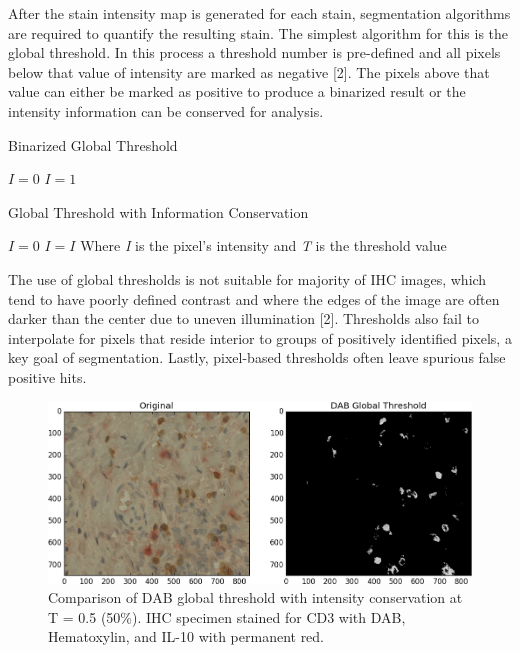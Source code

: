 \documentclass[12pt]{article}
\begin{document}
\newpage

After the stain intensity map is generated for each stain, segmentation algorithms are required to quantify the resulting stain. The simplest algorithm for this is the global threshold. In this process a threshold number is pre-defined and all pixels below that value of intensity are marked as negative [2]. The pixels above that value can either be marked as positive to produce a binarized result or the intensity information can be conserved for analysis.



\begin{algorithm}
\caption{Binarized Global Threshold}
\begin{algorithmic} 
\STATE $I = 0$
\STATE $I = 1$
\ENDIF
\ENDFOR
\end{algorithmic}
\end{algorithm}

\begin{algorithm}
\caption{Global Threshold with Information Conservation}
\begin{algorithmic} 
\STATE $I = 0$
\STATE $I = I$
\ENDIF
\ENDFOR
\STATE Where \textit{I} is the pixel's intensity
\STATE and \textit{T} is the threshold value
\end{algorithmic}
\end{algorithm}


The use of global thresholds is not suitable for majority of IHC images, which tend to have poorly defined contrast and where the edges of the image are often darker than the center due to uneven illumination [2]. Thresholds also fail to interpolate for pixels that reside interior to groups of positively identified pixels, a key goal of segmentation. Lastly, pixel-based thresholds often leave spurious false positive hits.


\begin{figure}[H]
  \includegraphics[width=\linewidth]{DABglobal2.png}
  \caption{Comparison of DAB global threshold with intensity conservation at T = 0.5 (50\%). IHC specimen stained for CD3 with DAB, Hematoxylin, and IL-10 with permanent red.}
  \label{fig:DABglobal2}
\end{figure}
\end{document}
